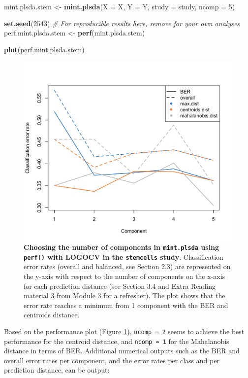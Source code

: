 \documentclass[]{book}
\newenvironment{Shaded}{\begin{snugshade}}{\end{snugshade}}
\newcommand{\CommentTok}[1]{\textcolor[rgb]{0.56,0.35,0.01}{\textit{#1}}}
\newcommand{\DataTypeTok}[1]{\textcolor[rgb]{0.13,0.29,0.53}{#1}}
\newcommand{\DecValTok}[1]{\textcolor[rgb]{0.00,0.00,0.81}{#1}}
\newcommand{\KeywordTok}[1]{\textcolor[rgb]{0.13,0.29,0.53}{\textbf{#1}}}
\newcommand{\NormalTok}[1]{#1}
\newcommand{\StringTok}[1]{\textcolor[rgb]{0.31,0.60,0.02}{#1}}
\begin{document}
\begin{Shaded}
\begin{Highlighting}[]
\NormalTok{mint.plsda.stem <-}\StringTok{ }\KeywordTok{mint.plsda}\NormalTok{(}\DataTypeTok{X =}\NormalTok{ X, }\DataTypeTok{Y =}\NormalTok{ Y, }\DataTypeTok{study =}\NormalTok{ study, }\DataTypeTok{ncomp =} \DecValTok{5}\NormalTok{)}

\KeywordTok{set.seed}\NormalTok{(}\DecValTok{2543}\NormalTok{) }\CommentTok{# For reproducible results here, remove for your own analyses}
\NormalTok{perf.mint.plsda.stem <-}\StringTok{ }\KeywordTok{perf}\NormalTok{(mint.plsda.stem) }

\KeywordTok{plot}\NormalTok{(perf.mint.plsda.stem)}
\end{Highlighting}
\end{Shaded}

\begin{figure}

{\centering \includegraphics[width=0.5\linewidth]{Figures/MINT/MINT-perf-1} 

}

\caption{\textbf{Choosing the number of components in \texttt{mint.plsda} using \texttt{perf()} with LOGOCV in the \texttt{stemcells} study}. Classification error rates (overall and balanced, see Section 2.3) are represented on the y-axis with respect to the number of components on the x-axis for each prediction distance (see Section 3.4 and Extra Reading material 3 from Module 3 for a refresher). The plot shows that the error rate reaches a minimum from 1 component with the BER and centroids distance.}\label{fig:MINT-perf}
\end{figure}



Based on the performance plot (Figure \ref{fig:MINT-perf}), \texttt{ncomp\ =\ 2} seems to achieve the best performance for the centroid distance, and \texttt{ncomp\ =\ 1} for the Mahalanobis distance in terms of BER. Additional numerical outputs such as the BER and overall error rates per component, and the error rates per class and per prediction distance, can be output:
\end{document}
